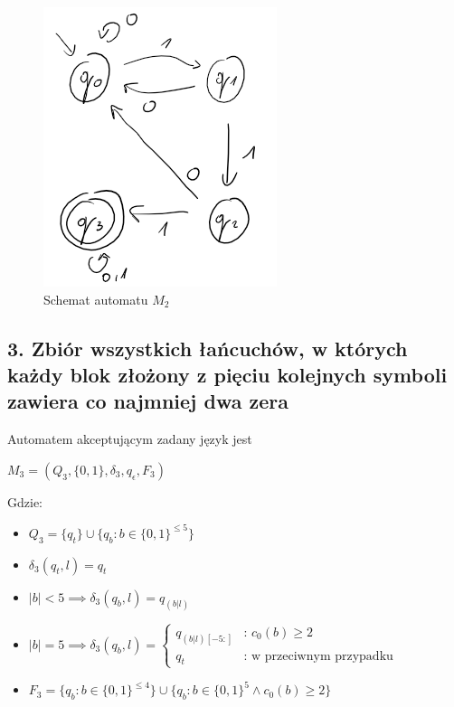 \documentclass[12pt]{article}
\begin{document}
    \begin{figure}[h]
        \centering
        \includegraphics[width=0.5\linewidth]{img/m2.png}
        \caption{Schemat automatu $M_2$}
        \label{fig:m2}
    \end{figure}

\newpage

\subsection*{3. Zbiór wszystkich łańcuchów, w których każdy blok złożony z pięciu kolejnych symboli
zawiera co najmniej dwa zera}
    Automatem akceptującym zadany język jest
    \begin{center}
    \begin{math}
        M_3 = (Q_3, \{0, 1\}, \delta_3, q_\epsilon, F_3)
    \end{math}
    \end{center}

    \noindent Gdzie:
    \begin{itemize}
        \item $Q_3 = \{q_t\} \cup \{q_b : b \in \{0, 1\}^{\leq 5}\}$
        \item $\delta_3(q_t, l) = q_t$
        \item $|b| < 5 \implies \delta_3(q_b, l) = q_{(b|l)}$
        \item $
        |b| = 5 \implies \delta_3(q_b, l) =
        \begin{cases}
            q_{(b|l)[-5:]} & \text{: } c_0(b) \geq 2 \\
            q_t & \text{: w przeciwnym przypadku}
        \end{cases}$
        \item $F_3 = \{q_b : b \in \{0, 1\}^{\leq 4}\} \cup \{q_b : b \in \{0, 1\}^5 \land c_0(b) \geq 2\}$
    \end{itemize}
\end{document}
